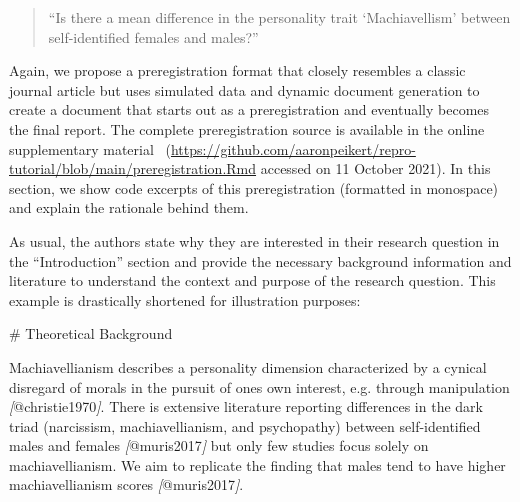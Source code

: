 \documentclass[psych,tutorial,accept,moreauthors,pdftex]{Definitions/mdpi}
\newenvironment{Shaded}{\begin{snugshade}}{\end{snugshade}}
\newcommand{\CommentTok}[1]{\textcolor[rgb]{0.56,0.35,0.01}{\textit{#1}}}
\newcommand{\FunctionTok}[1]{\textcolor[rgb]{0.00,0.00,0.00}{#1}}
\newcommand{\NormalTok}[1]{#1}
\newcommand{\OtherTok}[1]{\textcolor[rgb]{0.56,0.35,0.01}{#1}}
\begin{document}
\begin{paracol}{2}
\begin{quote}
``Is there a mean difference in the personality trait `Machiavellism'
between self-identified females and males?''
\end{quote}

Again, we propose a preregistration format that closely resembles a
classic journal article but uses simulated data and dynamic document
generation to create a document that starts out as a preregistration and
eventually becomes the final report. The complete preregistration source
is available in the {online supplementary material}
~(\url{https://github.com/aaronpeikert/repro-tutorial/blob/main/preregistration.Rmd} accessed on 11 October 2021). In this section, we show code excerpts of this
preregistration (formatted in monospace) and explain the rationale
behind them.

As usual, the authors state why they are interested in their research
question in the ``Introduction'' section and provide the necessary
background information and literature to understand the context and
purpose of the research question. This example is drastically shortened
for illustration purposes:

\vspace{+6pt}
\end{paracol}
\nointerlineskip
\begin{adjustwidth}{0.5cm}{0cm} 
\begin{Shaded}
\begin{Highlighting}[]
\FunctionTok{\# Theoretical Background}

\NormalTok{Machiavellianism describes a personality dimension characterized by a}
\NormalTok{cynical disregard of morals in the pursuit of one\textquotesingle{}s own interest, e.g.}
\NormalTok{through manipulation }\CommentTok{[}\OtherTok{@christie1970}\CommentTok{]}\NormalTok{. There is extensive literature reporting}
\NormalTok{differences in the dark triad (narcissism, machiavellianism, and psychopathy)}
\NormalTok{between self{-}identified males and females }\CommentTok{[}\OtherTok{@muris2017}\CommentTok{]}\NormalTok{ but only few studies}
\NormalTok{focus solely on machiavellianism. We aim to replicate the finding that males}
\NormalTok{tend to have higher machiavellianism scores }\CommentTok{[}\OtherTok{@muris2017}\CommentTok{]}\NormalTok{.}
\end{Highlighting}
\end{Shaded}
\end{adjustwidth}
\end{document}
